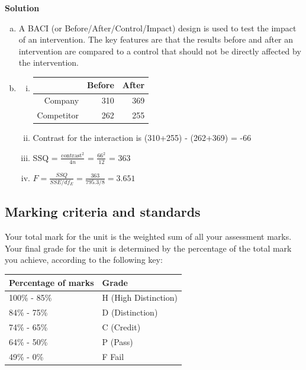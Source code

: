 \documentclass{uws_learning_guide}
\begin{document}
\textbf{Solution}
\begin{enumerate}[a)]
\item A BACI (or Before/After/Control/Impact) design is used to
  test the impact of an intervention. The key features are that the
  results before and after an intervention are compared to a control
  that should not be directly affected by the intervention.
\item \begin{enumerate}[i)]
\item \begin{tabular}{rrr}
  \toprule
 & Before & After \\ 
  \midrule
Company & 310 & 369 \\ 
  Competitor & 262 & 255 \\ 
   \bottomrule
\end{tabular}
\item Contrast for the interaction is (310+255) - (262+369) = -66
\item SSQ = $\frac{\text{contrast}^2}{4n}$ = $\frac{66^2}{12}$ = 363
\item $F = \frac{SSQ}{SSE/df_E} = \frac{363}{795.3/8} = 3.651$
\end{enumerate}
\end{enumerate}
















\subsection{Marking criteria and standards}

Your total mark for the unit is the weighted sum of all your
assessment marks.  Your final grade for the unit is determined by the
percentage of the total mark you achieve, according to the following
key:

\begin{center}
  \begin{tabularx}{0.5\textwidth}{XX}
    \toprule
    Percentage of marks & Grade \\
    \midrule
    100\% - 85\% & H (High Distinction) \\
    84\% - 75\% & D (Distinction) \\
    74\% - 65\% & C (Credit) \\
    64\% - 50\% & P (Pass) \\
    49\% - 0\% & F Fail \\
    \bottomrule
  \end{tabularx}
\end{center}
\end{document}
